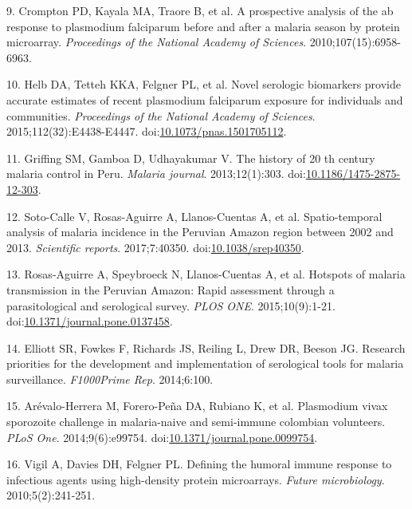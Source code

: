 \documentclass[]{article}
\begin{document}
\hypertarget{ref-crompton2010}{}
9. Crompton PD, Kayala MA, Traore B, et al. A prospective analysis of
the ab response to plasmodium falciparum before and after a malaria
season by protein microarray. \emph{Proceedings of the National Academy
of Sciences}. 2010;107(15):6958-6963.

\hypertarget{ref-Helb2015exposure}{}
10. Helb DA, Tetteh KKA, Felgner PL, et al. Novel serologic biomarkers
provide accurate estimates of recent plasmodium falciparum exposure for
individuals and communities. \emph{Proceedings of the National Academy
of Sciences}. 2015;112(32):E4438-E4447.
doi:\href{https://doi.org/10.1073/pnas.1501705112}{10.1073/pnas.1501705112}.

\hypertarget{ref-griffing2013history}{}
11. Griffing SM, Gamboa D, Udhayakumar V. The history of 20 th century
malaria control in Peru. \emph{Malaria journal}. 2013;12(1):303.
doi:\href{https://doi.org/10.1186/1475-2875-12-303}{10.1186/1475-2875-12-303}.

\hypertarget{ref-soto2017spatio}{}
12. Soto-Calle V, Rosas-Aguirre A, Llanos-Cuentas A, et al.
Spatio-temporal analysis of malaria incidence in the Peruvian Amazon
region between 2002 and 2013. \emph{Scientific reports}. 2017;7:40350.
doi:\href{https://doi.org/10.1038/srep40350}{10.1038/srep40350}.

\hypertarget{ref-hotspots2015}{}
13. Rosas-Aguirre A, Speybroeck N, Llanos-Cuentas A, et al. Hotspots of
malaria transmission in the Peruvian Amazon: Rapid assessment through a
parasitological and serological survey. \emph{PLOS ONE}.
2015;10(9):1-21.
doi:\href{https://doi.org/10.1371/journal.pone.0137458}{10.1371/journal.pone.0137458}.

\hypertarget{ref-elliott2014}{}
14. Elliott SR, Fowkes F, Richards JS, Reiling L, Drew DR, Beeson JG.
Research priorities for the development and implementation of
serological tools for malaria surveillance. \emph{F1000Prime Rep}.
2014;6:100.

\hypertarget{ref-arevalo2014}{}
15. Arévalo-Herrera M, Forero-Peña DA, Rubiano K, et al. Plasmodium
vivax sporozoite challenge in malaria-naive and semi-immune colombian
volunteers. \emph{PLoS One}. 2014;9(6):e99754.
doi:\href{https://doi.org/10.1371/journal.pone.0099754}{10.1371/journal.pone.0099754}.

\hypertarget{ref-vigil2010}{}
16. Vigil A, Davies DH, Felgner PL. Defining the humoral immune response
to infectious agents using high-density protein microarrays.
\emph{Future microbiology}. 2010;5(2):241-251.
\end{document}
